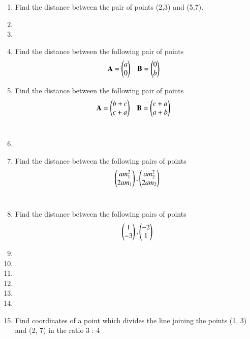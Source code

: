 \renewcommand{\theequation}{\theenumi}
\renewcommand{\thefigure}{\theenumi}
\begin{enumerate}[label=\thesubsection.\arabic*.,ref=\thesubsection.\theenumi]

\item Find the distance between the pair of points (2,3) and (5,7). 
\\
\solution

\item 


\item 
\item 
Find the distance between the following pair of points
\begin{align}
\mathbf{A}&=\begin{pmatrix}a\\0\end{pmatrix} & \mathbf{B}&=\begin{pmatrix}0\\b\end{pmatrix}
\end{align}
\solution
		
\item 
Find the distance between the following pair of points
\begin{align}
\mathbf{A}&=\begin{pmatrix}b+c\\c+a\end{pmatrix} & \mathbf{B}&=\begin{pmatrix}c+a\\a+b\end{pmatrix}
\end{align}
\\
\solution

\item 
\item 
Find the distance between the following pairs of points
\begin{align}
\begin{pmatrix}am_1^2\\2am_1\end{pmatrix}, \begin{pmatrix}am_2^2\\2am_2\end{pmatrix}
\end{align}
\\
\solution
	
\item 
Find the distance between the following pairs of points
\begin{align}
\begin{pmatrix}1\\-3\end{pmatrix}, \begin{pmatrix}-2\\1\end{pmatrix}
\end{align}
\solution
	
\item 
\item 
\item 
\item 
\item 
\item 
\item 
Find coordinates of a point which divides the line joining the points (1, 3) and (2, 7) in the ratio 3 : 4
\\
\solution
		
 

\end{enumerate}
